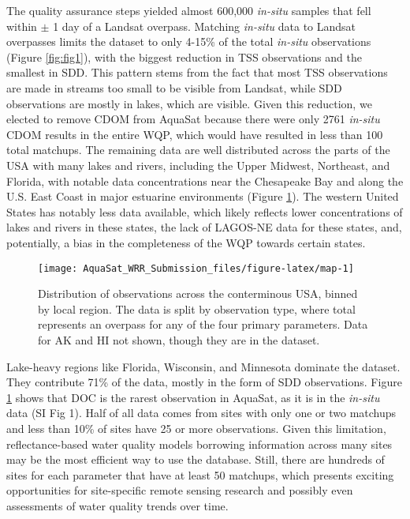 \documentclass[]{agujournal2018}
\begin{document}
The quality assurance steps yielded almost 600,000 \emph{in-situ}
samples that fell within \(\pm\) 1 day of a Landsat overpass. Matching
\emph{in-situ} data to Landsat overpasses limits the dataset to only
4-15\% of the total \emph{in-situ} observations (Figure \ref{fig:fig1}),
with the biggest reduction in TSS observations and the smallest in SDD.
This pattern stems from the fact that most TSS observations are made in
streams too small to be visible from Landsat, while SDD observations are
mostly in lakes, which are visible. Given this reduction, we elected to
remove CDOM from AquaSat because there were only 2761 \emph{in-situ}
CDOM results in the entire WQP, which would have resulted in less than
100 total matchups. The remaining data are well distributed across the
parts of the USA with many lakes and rivers, including the Upper
Midwest, Northeast, and Florida, with notable data concentrations near
the Chesapeake Bay and along the U.S. East Coast in major estuarine
environments (Figure \ref{fig:map}). The western United States has
notably less data available, which likely reflects lower concentrations
of lakes and rivers in these states, the lack of LAGOS-NE data for these
states, and, potentially, a bias in the completeness of the WQP towards
certain states.

\begin{figure}[h]
\texttt{[image: AquaSat\_WRR\_Submission\_files/figure-latex/map-1]} \caption{Distribution of observations across the conterminous USA, binned by local region. The data is split by observation type, where total represents an overpass for any of the four primary parameters. Data for AK and HI not shown, though they are in the dataset.}\label{fig:map}
\end{figure}

Lake-heavy regions like Florida, Wisconsin, and Minnesota dominate the
dataset. They contribute 71\% of the data, mostly in the form of SDD
observations. Figure \ref{fig:map} shows that DOC is the rarest
observation in AquaSat, as it is in the \emph{in-situ} data (SI Fig 1).
Half of all data comes from sites with only one or two matchups and less
than 10\% of sites have 25 or more observations. Given this limitation,
reflectance-based water quality models borrowing information across many
sites may be the most efficient way to use the database. Still, there
are hundreds of sites for each parameter that have at least 50 matchups,
which presents exciting opportunities for site-specific remote sensing
research and possibly even assessments of water quality trends over
time.
\end{document}

